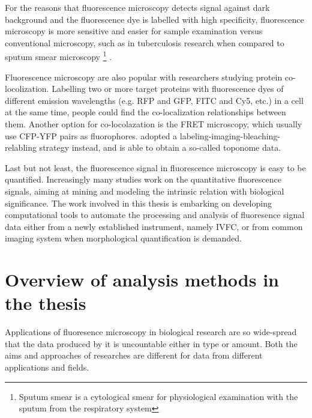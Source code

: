 For the reasons that fluorescence microscopy detects signal against dark background and the fluorescence dye is labelled with high specificity, fluorescence microscopy is more sensitive and easier for sample examination versus conventional microscopy, such as in tuberculosis research when compared to sputum smear microscopy \footnote{Sputum smear is a cytological smear for physiological examination with the sputum from the respiratory system} \parencite{Steingart2006Fluorescence}.

Fluorescence microscopy are also popular with researchers studying protein co-locolization. Labelling two or more target proteins with fluorescence dyes of different emission wavelengths (e.g. \ac{RFP} and \ac{GFP}, \ac{FITC} and Cy5, etc.) in a cell at the same time, people could find the co-localization relationships between them. Another option for co-locolazation is the \ac{FRET} microscopy, which usually use \ac{CFP}-\ac{YFP} pairs as fluorophores. \Cite{Schubert2006Analyzing} adopted a labeling-imaging-bleaching-relabling strategy instead, and is able to obtain a so-called toponome data.

Last but not least, the fluorescence signal in fluorescence microscopy is easy to be quantified. Increasingly many studies work on the quantitative fluorescence signals, aiming at mining and modeling the intrinsic relation with biological significance. The work involved in this thesis is embarking on developing computational tools to automate the processing and analysis of fluoresence signal data either from a newly established instrument, namely \ac{IVFC}, or from common imaging system when morphological quantification is demanded.


\section{Overview of analysis methods in the thesis}

Applications of fluoresence microscopy in biological research are so wide-spread that the data produced by it is uncountable either in type or amount. Both the aims and approaches of researches are different for data from different applications and fields.


